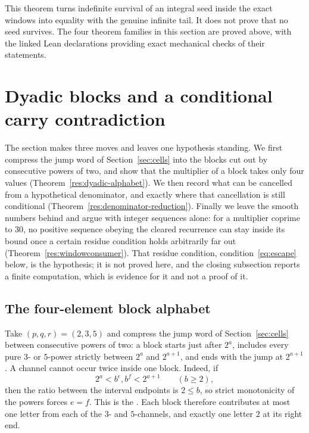 \documentclass[11pt]{article}
\begin{document}
This theorem turns indefinite survival of an integral seed inside the exact
windows into equality with the genuine infinite tail.  It does not prove that
no seed survives.  The four theorem families in this section are
proved above, with the linked Lean declarations providing exact mechanical
checks of their statements.

\section{Dyadic blocks and a conditional carry contradiction}\label{sec:escape}

The section makes three moves and leaves one hypothesis standing.  We first
compress the jump word of Section~\ref{sec:cells} into the blocks cut out by
consecutive powers of two, and show that the multiplier of a block takes only
four values (Theorem~\ref{res:dyadic-alphabet}).  We then record what can be
cancelled from a hypothetical denominator, and exactly where that cancellation
is still conditional (Theorem~\ref{res:denominator-reduction}).  Finally we
leave the smooth numbers behind and argue with integer sequences alone: for a
multiplier coprime to $30$, no positive sequence obeying the cleared recurrence
can stay inside its bound once a certain residue condition holds arbitrarily
far out (Theorem~\ref{res:windowconsumer}).  That residue condition,
condition~\eqref{eq:escape} below, is the hypothesis; it is not proved here,
and the closing subsection reports a finite computation, which is evidence for
it and not a proof of it.

\subsection{The four-element block alphabet}

Take $(p,q,r)=(2,3,5)$ and compress the jump word of Section~\ref{sec:cells}
between consecutive powers of two: a block starts just
after $2^a$, includes every pure $3$- or $5$-power strictly between $2^a$ and
$2^{a+1}$, and ends with the jump at $2^{a+1}$.  A channel cannot occur twice
inside one block.  Indeed, if
\[
  2^a<b^e,b^f<2^{a+1}\qquad(b\ge2),
\]
then the ratio between the interval endpoints is $2\le b$, so strict
monotonicity of the powers forces $e=f$.  This is the
.  Each block therefore contributes at most one
letter from each of the $3$- and $5$-channels, and exactly one letter $2$ at its
right end.
\end{document}
